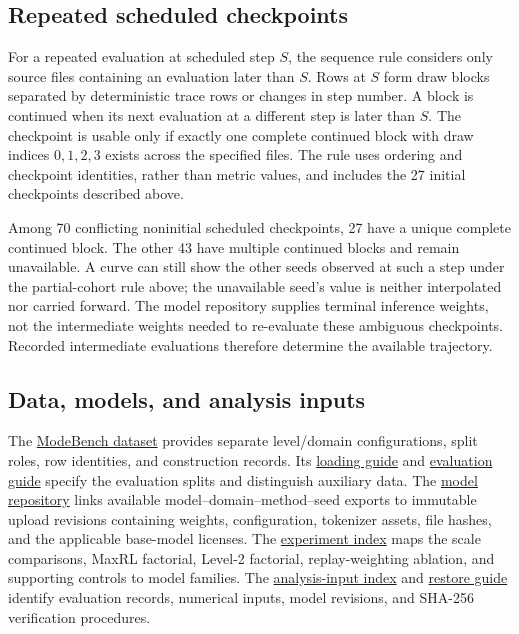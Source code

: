 \documentclass{article}
\newcommand{\1}{\mathbf 1}
\theoremstyle{remark}
\theoremstyle{definition}
\theoremstyle{plain}
\begin{document}
\subsection{Repeated scheduled checkpoints}
\label{app:scheduled-provenance}

For a repeated evaluation at scheduled step $S$, the sequence rule
considers only source files containing an evaluation later than $S$.
Rows at $S$ form draw blocks separated by deterministic trace rows or
changes in step number. A block is continued when its next evaluation at
a different step is later than $S$. The checkpoint is usable only if
exactly one complete continued block with draw indices $0,1,2,3$ exists
across the specified files. The rule uses ordering and checkpoint
identities, rather than metric values, and includes the 27 initial
checkpoints described above.

Among 70 conflicting noninitial scheduled checkpoints, 27 have a unique
complete continued block. The other 43 have multiple continued blocks
and remain unavailable. A curve can still show the other seeds observed
at such a step under the partial-cohort rule above; the unavailable
seed's value is neither interpolated nor carried forward. The model repository supplies terminal inference weights, not the intermediate
weights needed to re-evaluate these ambiguous checkpoints. Recorded
intermediate evaluations therefore determine the available trajectory.

\subsection{Data, models, and analysis inputs}
\label{app:repro-artifacts}
\label{app:repro-code}
\label{app:archived-models}

The \href{https://huggingface.co/datasets/od2961/ModeBench}{ModeBench dataset}
provides separate level/domain configurations, split roles, row
identities, and construction records. Its
\href{https://huggingface.co/datasets/od2961/ModeBench\#loading}{loading guide}
and \href{https://huggingface.co/datasets/od2961/ModeBench\#evaluation}{evaluation guide}
specify the evaluation splits and distinguish auxiliary data.
The \href{https://huggingface.co/od2961/maxent-grpo-models}{model repository}
links available model--domain--method--seed exports to immutable upload
revisions containing weights, configuration, tokenizer assets, file hashes,
and the applicable base-model licenses.
The \href{https://huggingface.co/od2961/maxent-grpo-models/blob/main/EXPERIMENTS.md}{experiment index}
maps the scale comparisons, MaxRL factorial, Level-2 factorial,
replay-weighting ablation, and supporting controls to model families.
The \href{https://huggingface.co/od2961/maxent-grpo-models/blob/main/DATA.md}{analysis-input index}
and \href{https://huggingface.co/od2961/maxent-grpo-models/blob/main/RESTORE.md}{restore guide}
identify evaluation records, numerical inputs, model revisions, and
SHA-256 verification procedures.
\end{document}
